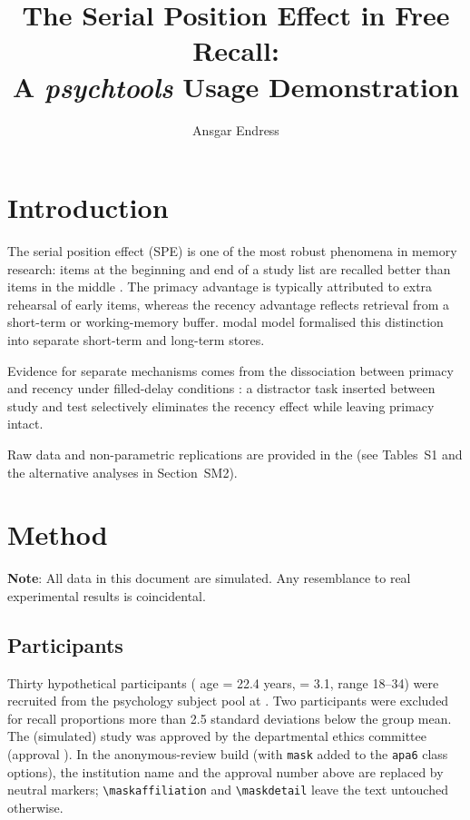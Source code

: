 \documentclass[man,floatsintext]{apa6}   %
\title{The Serial Position Effect in Free Recall:\\
  A \textit{psychtools} Usage Demonstration}
\author{Ansgar Endress}
\affiliation{Department of Psychology, \maskaffiliation{City St George's, University of London}}
\begin{document}
\maketitle

\section{Introduction}

The serial position effect (SPE) is one of the most robust phenomena in
memory research: items at the beginning and end of a study list are recalled
better than items in the middle . The primacy advantage
is typically attributed to extra rehearsal of early items, whereas the
recency advantage reflects retrieval from a short-term or working-memory
buffer. \cites{AtkinsonShiffrin1968} modal model formalised this distinction
into separate short-term and long-term stores.%

Evidence for separate mechanisms comes from the dissociation between primacy
and recency under filled-delay conditions : a
distractor task inserted between study and test selectively eliminates the
recency effect while leaving primacy intact.

Raw data and non-parametric replications are provided in the
\appendixshortname{} (see Tables~S1 and the alternative analyses in
Section~SM2).

\section{Method}

\textbf{Note}: All data in this document are simulated. Any resemblance to
real experimental results is coincidental.

\subsection{Participants}

Thirty hypothetical participants (\M{} age = 22.4 years, \SD{} = 3.1,
range 18--34) were recruited from the psychology subject pool at
. Two participants
were excluded for recall proportions more than 2.5 standard deviations below
the group mean.%
The (simulated) study was approved by the departmental ethics committee
(approval ).  In the anonymous-review build
(with \texttt{mask} added to the \texttt{apa6} class options), the
institution name and the approval number above are replaced by neutral
markers; \texttt{\textbackslash maskaffiliation} and
\texttt{\textbackslash maskdetail} leave the text untouched otherwise.
\end{document}
